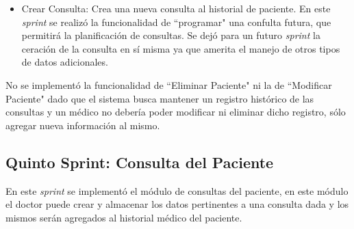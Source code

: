 \begin{enumerate}
\begin{itemize}
\begin{itemize}
                \item Crear Consulta: Crea una nueva consulta al historial de paciente. En este \textit{sprint} se realizó la funcionalidad de ``programar" una confulta futura, que permitirá la planificación de consultas. Se dejó para un futuro \textit{sprint} la ceración de la consulta en sí misma ya que amerita el manejo de otros tipos de datos adicionales.
            \end{itemize}           
            
            No se implementó la funcionalidad de ``Eliminar Paciente" ni la de ``Modificar Paciente" dado que el sistema busca mantener un registro histórico de las consultas y un médico no debería poder modificar ni eliminar dicho registro, sólo agregar nueva información al mismo.
            
        \end{itemize}

    \end{enumerate}
        
        
    \subsection{Quinto Sprint: Consulta del Paciente}
    
    En este \textit{sprint} se implementó el módulo de consultas del paciente, en este módulo el doctor puede crear y almacenar los datos pertinentes a una consulta dada y los mismos serán agregados al historial médico del paciente.
    
